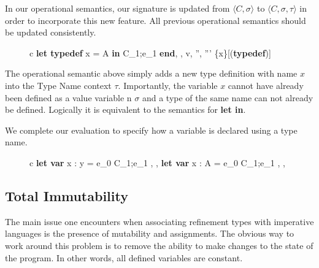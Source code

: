 \documentclass[a4paper,12pt]{report}
\begin{document}
\par
In our operational semantics, our signature is updated from $\langle C, \sigma \rangle$ 
to $\langle C, \sigma, \tau \rangle$ in order to incorporate this new feature. 
All previous operational semantics should be updated consistently.

\begin{figure}[H]
  \begin{center}
    \begin{tabular} {c}
      {\langle \textbf{let typedef }x = A \textbf{ in }C_1;e_1\textbf{ end}, 
      \sigma, \tau \rangle \Longrightarrow 
        \langle v, \sigma'', \tau''' \setminus \{x\}\rangle}[(\textbf{typedef})] \text{ }    
    \end{tabular}
  \end{center}
\end{figure}

\par
The operational semantic above simply adds a new type definition with name $x$ 
into the Type Name context $\tau$. Importantly, the variable $x$ cannot have 
already been defined as a value variable n $\sigma$ and a type of the same name 
can not already be defined. Logically it is equivalent to the semantics for 
\textbf{let in}.

\par
We complete our evaluation to specify how a variable is declared using a type 
name. 

\begin{figure}[H]
  \begin{center}
    \begin{tabular} {c}
      {\langle\textbf{let var }x : y = e_0  C_1;e_1 , \sigma, \tau \rangle 
      \Longrightarrow \langle\textbf{let var }x : A = e_0  C_1;e_1 , \sigma, \tau \rangle }
    \end{tabular}
  \end{center}
\end{figure}

\subsection{Total Immutability}
The main issue one encounters when associating refinement types with imperative 
languages is the presence of mutability and assignments. The obvious way to 
work around this problem is to remove the ability to make changes to the state 
of the program. In other words, all defined variables are constant. 
\end{document}

